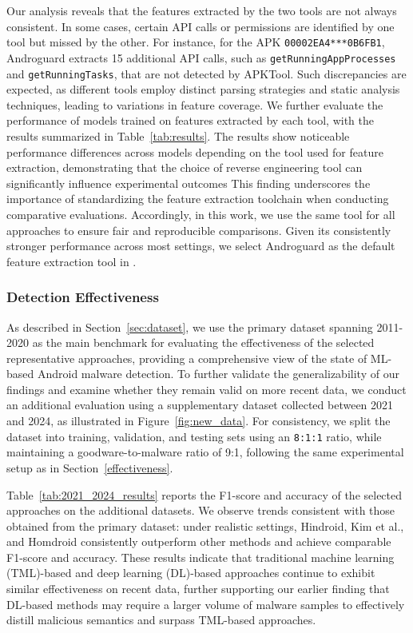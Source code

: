 Our analysis reveals that the features extracted by the two tools are not always consistent.
In some cases, certain API calls or permissions are identified by one tool but missed by the other.
For instance, for the APK \texttt{00002EA4***0B6FB1}, Androguard extracts 15 additional API calls, such as \texttt{getRunningAppProcesses} and \texttt{getRunningTasks}, that are not detected by APKTool.
Such discrepancies are expected, as different tools employ distinct parsing strategies and static analysis techniques, leading to variations in feature coverage.
We further evaluate the performance of models trained on features extracted by each tool, with the results summarized in Table~\ref{tab:results}.
The results show noticeable performance differences across models depending on the tool used for feature extraction, demonstrating that the choice of reverse engineering tool can significantly influence experimental outcomes
This finding underscores the importance of standardizing the feature extraction toolchain when conducting comparative evaluations.
Accordingly, in this work, we use the same tool for all approaches to ensure fair and reproducible comparisons.
Given its consistently stronger performance across most settings, we select Androguard as the default feature extraction tool in \codename.



\subsubsection{\textbf{Detection Effectiveness}}
\label{sec:detect_effectiveness}
As described in Section~\ref{sec:dataset}, we use the primary dataset spanning 2011-2020 as the main benchmark for evaluating the effectiveness of the selected representative approaches, providing a comprehensive view of the state of ML-based Android malware detection.
To further validate the generalizability of our findings and examine whether they remain valid on more recent data, we conduct an additional evaluation using a supplementary dataset collected between 2021 and 2024, as illustrated in Figure~\ref{fig:new_data}.
For consistency, we split the dataset into training, validation, and testing sets using an \texttt{8:1:1} ratio, while maintaining a goodware-to-malware ratio of 9:1, following the same experimental setup as in Section~\ref{effectiveness}.

Table~\ref{tab:2021_2024_results} reports the F1-score and accuracy of the selected approaches on the additional datasets.
We observe trends consistent with those obtained from the primary dataset: under realistic settings, Hindroid, Kim et al., and Homdroid consistently outperform other methods and achieve comparable F1-score and accuracy.
These results indicate that traditional machine learning (TML)-based and deep learning (DL)-based approaches continue to exhibit similar effectiveness on recent data, further supporting our earlier finding that DL-based methods may require a larger volume of malware samples to effectively distill malicious semantics and surpass TML-based approaches.


